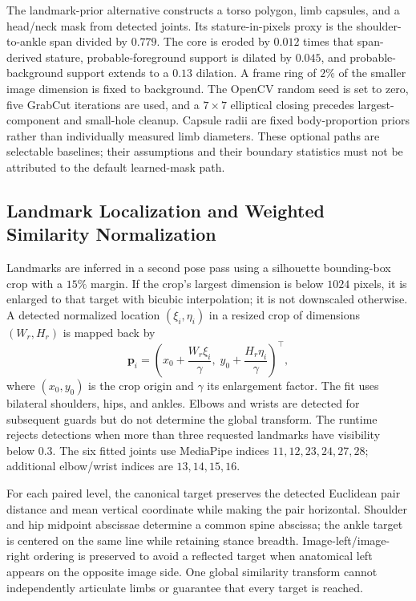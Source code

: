 \documentclass[11pt,a4paper]{article}
\numberwithin{equation}{section}
\begin{document}
The landmark-prior alternative constructs a torso polygon, limb capsules, and a head/neck mask from detected joints. Its stature-in-pixels proxy is the shoulder-to-ankle span divided by $0.779$. The core is eroded by $0.012$ times that span-derived stature, probable-foreground support is dilated by $0.045$, and probable-background support extends to a $0.13$ dilation. A frame ring of $2\%$ of the smaller image dimension is fixed to background. The OpenCV random seed is set to zero, five GrabCut iterations are used, and a $7\times7$ elliptical closing precedes largest-component and small-hole cleanup. Capsule radii are fixed body-proportion priors rather than individually measured limb diameters. These optional paths are selectable baselines; their assumptions and their boundary statistics must not be attributed to the default learned-mask path.

\subsection{Landmark Localization and Weighted Similarity Normalization}
\label{subsec:procrustes}
Landmarks are inferred in a second pose pass using a silhouette bounding-box crop with a $15\%$ margin. If the crop's largest dimension is below $1024$ pixels, it is enlarged to that target with bicubic interpolation; it is not downscaled otherwise. A detected normalized location $(\xi_i,\eta_i)$ in a resized crop of dimensions $(W_r,H_r)$ is mapped back by
\begin{equation}
\mathbf p_i=\left(x_0+\frac{W_r\xi_i}{\gamma},\;y_0+\frac{H_r\eta_i}{\gamma}\right)^\top,
\end{equation}
where $(x_0,y_0)$ is the crop origin and $\gamma$ its enlargement factor. The fit uses bilateral shoulders, hips, and ankles. Elbows and wrists are detected for subsequent guards but do not determine the global transform. The runtime rejects detections when more than three requested landmarks have visibility below $0.3$. The six fitted joints use MediaPipe indices $11,12,23,24,27,28$; additional elbow/wrist indices are $13,14,15,16$.

For each paired level, the canonical target preserves the detected Euclidean pair distance and mean vertical coordinate while making the pair horizontal. Shoulder and hip midpoint abscissae determine a common spine abscissa; the ankle target is centered on the same line while retaining stance breadth. Image-left/image-right ordering is preserved to avoid a reflected target when anatomical left appears on the opposite image side. One global similarity transform cannot independently articulate limbs or guarantee that every target is reached.
\end{document}
